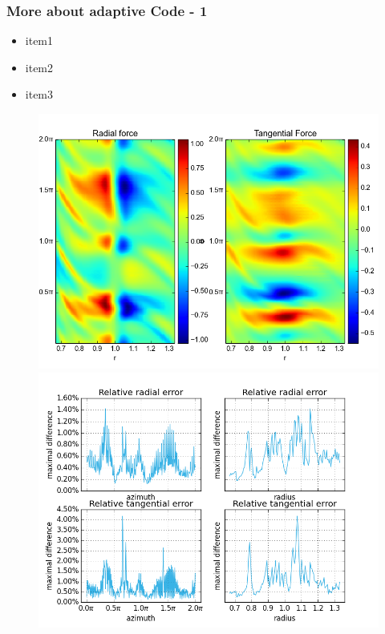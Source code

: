 \documentclass{beamer}
\begin{document}
\begin{frame}
 \frametitle{More about adaptive Code - 1}
\begin{itemize}
  \item item1
  \item item2
  \item item3
 \end{itemize}

 \begin{figure}[H]
  \centering
  \includegraphics[width=.5\textwidth]{../../../Sara/run/default/forcesA-euclid.png}     \includegraphics[width=.5\textwidth]{../../../Sara/run/default/diff_1D.png}
\end{figure}
\end{frame}
\end{document}
